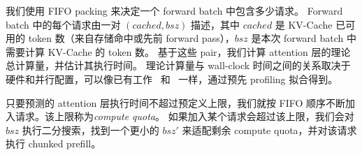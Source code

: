  我们使用 FIFO packing 来决定一个 forward batch 中包含多少请求。
Forward batch 中的每个请求由一对 $(cached, bsz)$ 描述，其中 $cached$ 是 KV-Cache 已可用的 token 数（来自存储命中或先前 forward pass），$bsz$ 是本次 forward batch 中需要计算 KV-Cache 的 token 数。
基于这些 pair，我们计算 attention 层的理论总计算量，并估计其执行时间。
理论计算量与 wall-clock 时间之间的关系取决于硬件和并行配置，可以像已有工作~\cite{SOSP25:PrefillOnly} 和~\cite{OSDI24:SarathiServe} 一样，通过预先 profiling 拟合得到。

 只要预测的 attention 层执行时间不超过预定义上限，我们就按 FIFO 顺序不断加入请求。该上限称为\emph{compute quota}。
如果加入某个请求会超过该上限，我们会对 $bsz$ 执行二分搜索，找到一个更小的 $bsz'$ 来适配剩余 compute quota，并对该请求执行 chunked prefill。
